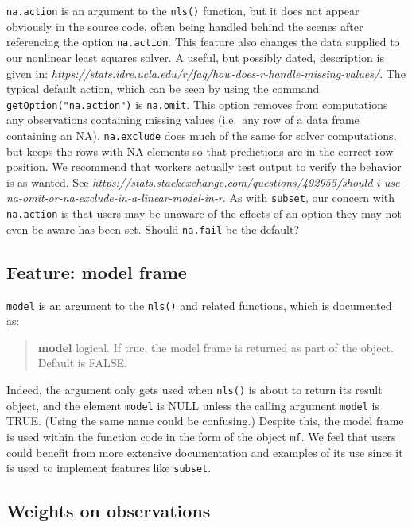 \texttt{na.action} is an argument to the \texttt{nls()} function, but it does not appear
obviously in the source code, often being handled behind the scenes after
referencing the option \texttt{na.action}. This feature also changes the data
supplied to our nonlinear least squares solver.
A useful, but possibly dated, description is given in:
\emph{\url{https://stats.idre.ucla.edu/r/faq/how-does-r-handle-missing-values/}}.
The typical default action, which can be seen by using the command
\texttt{getOption("na.action")}
is \texttt{na.omit}. This option removes from computations any observations
containing missing values (i.e.~any row of a data frame containing an NA).
\texttt{na.exclude} does much of the same for solver computations, but keeps the rows with
NA elements so that predictions are in the correct row position. We recommend that
workers actually test output to verify the behavior is as wanted.
See \emph{\url{https://stats.stackexchange.com/questions/492955/should-i-use-na-omit-or-na-exclude-in-a-linear-model-in-r}}.
As with \texttt{subset}, our concern with \texttt{na.action} is that users may be unaware of the
effects of an option they may not even be aware has been set. Should \texttt{na.fail} be the default?

\subsection{Feature: model frame}\label{feature-model-frame}

\texttt{model} is an argument to the \texttt{nls()} and related functions, which is documented as:

\begin{quote}
\textbf{model} logical. If true, the model frame is returned as part of the object. Default is FALSE.
\end{quote}

Indeed, the argument only gets used when \texttt{nls()} is about to return its result
object, and the
element \texttt{model} is NULL unless the calling argument \texttt{model} is TRUE. (Using the same
name could
be confusing.) Despite this, the model frame is used within the function code in
the form of the object
\texttt{mf}. We feel that users could benefit from more extensive documentation and
examples of its use since it is used to implement features like \texttt{subset}.

\subsection{Weights on observations}\label{weights-on-observations}

